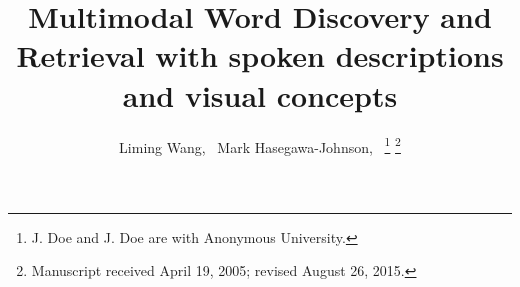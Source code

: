 \documentclass[journal]{IEEEtran}
\begin{document}
%
\title{Multimodal Word Discovery and Retrieval with spoken descriptions and visual concepts}
%
%
%

\author{Liming Wang,~
        Mark Hasegawa-Johnson,~
\thanks{J. Doe and J. Doe are with Anonymous University.}%
\thanks{Manuscript received April 19, 2005; revised August 26, 2015.}}

% 
%
\end{document}
